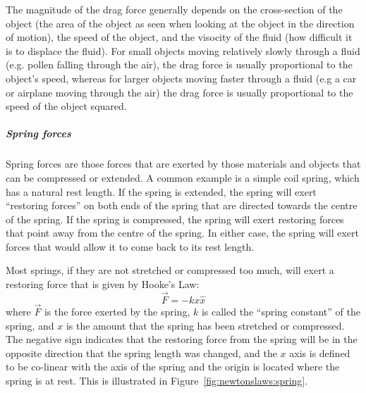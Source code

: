 The magnitude of the drag force generally depends on the cross-section of the object (the area of the object as seen when looking at the object in the direction of motion), the speed of the object, and the visocity of the fluid (how difficult it is to displace the fluid). For small objects moving relatively slowly through a fluid (e.g. pollen falling through the air), the drag force is usually proportional to the object's speed, whereas for larger objects moving faster through a fluid (e.g a car or airplane moving through the air) the drag force is usually proportional to the speed of the object squared.

\subparagraph{Spring forces}

Spring forces are those forces that are exerted by those materials and objects that can be compressed or extended. A common example is a simple coil spring, which has a natural rest length. If the spring is extended, the spring will exert ``restoring forces'' on both ends of the spring that are directed towards the centre of the spring. If the spring is compressed, the spring will exert restoring forces that point away from the centre of the spring. In either case, the spring will exert forces that would allow it to come back to its rest length.

Most springs, if they are not stretched or compressed too much, will exert a restoring force that is given by Hooke's Law:
\begin{equation}
\vec F = -kx \hat x
\end{equation}
where $\vec F$ is the force exerted by the spring, $k$ is called the ``spring constant'' of the spring, and $x$ is the amount that the spring has been stretched or compressed. The negative sign indicates that the restoring force from the spring will be in the opposite direction that the spring length was changed, and the $x$ axis is defined to be co-linear with the axis of the spring and the origin is located where the spring is at rest. This is illustrated in Figure~\ref{fig:newtonslaws:spring}.

